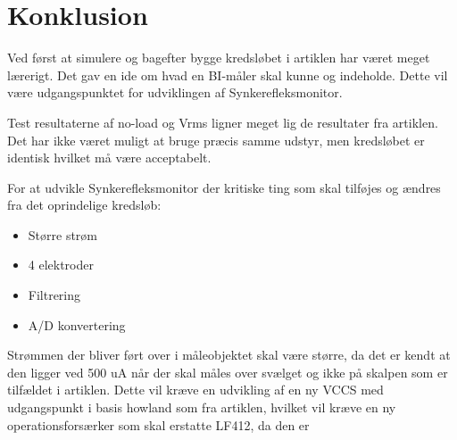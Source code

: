 %
%
%
 



\chapter{Konklusion}

Ved først at simulere og bagefter bygge kredsløbet i artiklen har været meget lærerigt. Det gav en ide om hvad en BI-måler skal kunne og indeholde. Dette vil være udgangspunktet for udviklingen af Synkerefleksmonitor.  

Test resultaterne af no-load og Vrms ligner meget lig de resultater fra artiklen. Det har ikke været muligt at bruge præcis samme udstyr, men kredsløbet er identisk hvilket må være acceptabelt.

For at udvikle Synkerefleksmonitor der kritiske ting som skal tilføjes og ændres fra det oprindelige kredsløb:
\begin{itemize}
\item Større strøm
\item 4 elektroder
\item Filtrering
\item A/D konvertering
\end{itemize}

Strømmen der bliver ført over i måleobjektet skal være større, da det er kendt at den ligger ved 500 uA\cite{Kusuhara2004} når der skal måles over svælget og ikke på skalpen som er tilfældet i artiklen. Dette vil kræve en udvikling af en ny VCCS med udgangspunkt i basis howland som fra artiklen, hvilket vil kræve en ny operationsforsærker som skal erstatte LF412, da den er  

